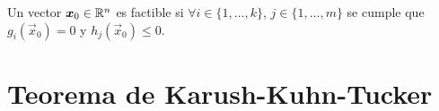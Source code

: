 \begin{definicion}
Un vector $\boldsymbol{x}_0 \in \mathbb{R}^n$ es factible si $\forall i\in\{1,\ldots , k\}$, $j\in\{1,\ldots , m\}$ se cumple que $g_i (\vec{x}_0) = 0$ y $h_j (\vec{x}_0)\leq 0$.
\end{definicion}





\section{Teorema de Karush-Kuhn-Tucker}

